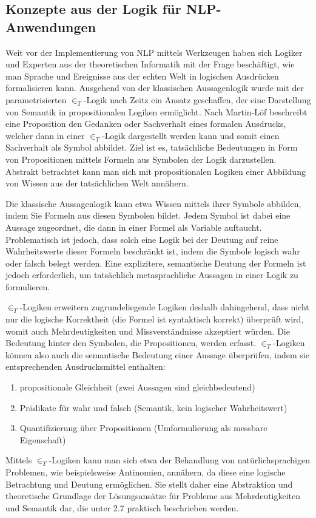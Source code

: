 \documentclass[12pt]{report}
\begin{document}
\subsection{Konzepte aus der Logik für NLP-Anwendungen}
Weit vor der Implementierung von NLP mittels Werkzeugen haben sich Logiker und Experten aus der theoretischen Informatik mit der Frage beschäftigt, wie man Sprache und Ereignisse aus der echten Welt in logischen Ausdrücken formalisieren kann. Ausgehend von der klassischen Aussagenlogik wurde mit der parametrisierten $\in_T$-Logik nach Zeitz \cite{ze00} ein Ansatz geschaffen, der eine Darstellung von Semantik in propositionalen Logiken ermöglicht. Nach Martin-Löf \cite{ml96} beschreibt eine Proposition den \glqq  Gedanken oder Sachverhalt eines formalen Ausdrucks\grqq{}, welcher dann in einer $\in_T$-Logik dargestellt werden kann und somit einen Sachverhalt als Symbol abbildet. Ziel ist es, tatsächliche Bedeutungen in Form von Propositionen mittels Formeln aus Symbolen der Logik darzustellen. Abstrakt betrachtet kann man sich mit propositionalen Logiken einer Abbildung von Wissen aus der tatsächlichen Welt annähern. 

Die klassische Aussagenlogik kann etwa Wissen mittels ihrer Symbole abbilden, indem Sie Formeln aus diesen Symbolen bildet. Jedem Symbol ist dabei eine Aussage zugeordnet, die dann in einer Formel als Variable auftaucht. Problematisch ist jedoch, dass solch eine Logik bei der Deutung auf reine Wahrheitswerte dieser Formeln beschränkt ist, indem die Symbole logisch wahr oder falsch belegt werden. Eine explizitere, semantische Deutung der Formeln ist jedoch erforderlich, um tatsächlich metasprachliche Aussagen in einer Logik zu formulieren. 

$\in_T$-Logiken erweitern zugrundeliegende Logiken deshalb dahingehend, dass nicht nur die logische Korrektheit (die Formel ist syntaktisch korrekt) überprüft wird, womit auch Mehrdeutigkeiten und Missverständnisse akzeptiert würden. Die Bedeutung hinter den Symbolen, die Propositionen, werden erfasst. $\in_T$-Logiken können also auch die semantische Bedeutung einer Aussage überprüfen, indem sie entsprechenden Ausdrucksmittel enthalten:
\begin{enumerate}
\item propositionale Gleichheit (zwei Aussagen sind gleichbedeutend)
\item Prädikate für wahr und falsch (Semantik, kein logischer Wahrheitswert)
\item Quantifizierung über Propositionen (Umformulierung als messbare Eigenschaft)
\end{enumerate}
Mittels $\in_T$-Logiken kann man sich etwa der Behandlung von natürlichsprachigen Problemen, wie beispielsweise Antinomien, annähern, da diese eine logische Betrachtung und Deutung ermöglichen. Sie stellt daher eine Abstraktion und theoretische Grundlage der Lösungsansätze für Probleme aus Mehrdeutigkeiten und Semantik dar, die unter 2.7 praktisch beschrieben werden.
\end{document}
